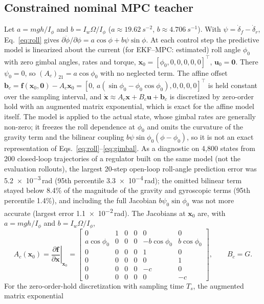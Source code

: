 \documentclass[preprint,12pt,authoryear=false]{elsarticle}
\theoremstyle{remark}\newtheorem{remark}{Remark}
\theoremstyle{plain}\newtheorem{proposition}{Proposition}\newtheorem{lemma}{Lemma}
\theoremstyle{definition}\newtheorem{assumption}{Assumption}
\begin{document}
\subsection{Constrained nominal MPC teacher}
Let $a=mgh/I_\phi$ and $b=I_w\Omega/I_\phi$ ($a\approx\SI{19.62}{s^{-2}}$, $b\approx\SI{4.706}{s^{-1}}$). With $\psi=\dot\delta_f-\dot\delta_r$, Eq.~\eqref{eq:roll} gives $\partial\ddot\phi/\partial\phi=a\cos\phi+b\psi\sin\phi$. At each control step the predictive model is linearized about the current (for EKF--MPC: estimated) roll angle $\phi_0$ with zero gimbal angles, rates and torque, $\bm x_0=[\phi_0,0,0,0,0,0]^\top$, $\bm u_0=\bm 0$. There $\psi_0=0$, so $(A_c)_{21}=a\cos\phi_0$ with no neglected term. The affine offset $\bm b_c=\bm f(\bm x_0,\bm 0)-A_c\bm x_0=[0,\,a(\sin\phi_0-\phi_0\cos\phi_0),0,0,0,0]^\top$ is held constant over the sampling interval, and $\dot{\bm x}\approx A_c\bm x+B_c\bm u+\bm b_c$ is discretized by zero-order hold with an augmented matrix exponential, which is exact for the affine model itself. The model is applied to the actual state, whose gimbal rates are generally non-zero; it freezes the roll dependence at $\phi_0$ and omits the curvature of the gravity term and the bilinear coupling $b\psi\sin\phi_0(\phi-\phi_0)$, so it is not an exact representation of Eqs.~\eqref{eq:roll}--\eqref{eq:gimbal}. As a diagnostic on 4{,}800 states from 200 closed-loop trajectories of a regulator built on the same model (not the evaluation rollouts), the largest 20-step open-loop roll-angle prediction error was \num{5.2e-3}\,rad (95th percentile \num{3.3e-4}\,rad); the omitted bilinear term stayed below 8.4\% of the magnitude of the gravity and gyroscopic terms (95th percentile 1.4\%), and including the full Jacobian $b\psi_0\sin\phi_0$ was not more accurate (largest error \num{1.1e-2}\,rad). The Jacobians at $\bm x_0$ are, with $a=mgh/I_\phi$ and $b=I_w\Omega/I_\phi$,
\begin{equation}
A_c(\bm x_0)=\left.\frac{\partial\bm f}{\partial\bm x}\right|_{\bm x_0}=\begin{bmatrix}
0&1&0&0&0&0\\
a\cos\phi_0&0&0&0&-b\cos\phi_0&b\cos\phi_0\\
0&0&0&0&1&0\\
0&0&0&0&0&1\\
0&0&0&0&-c&0\\
0&0&0&0&0&-c\end{bmatrix},\qquad B_c=G.\label{eq:Ac}
\end{equation}
For the zero-order-hold discretization with sampling time $T_s$, the augmented matrix exponential
\end{document}
